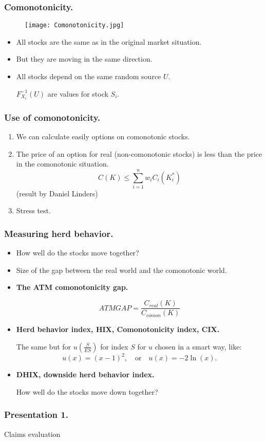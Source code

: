 \documentclass{beamer}
\begin{document}
\begin{frame}
\frametitle{Comonotonicity.}
\begin{figure}[h!]
\centering
\texttt{[image: Comonotonicity.jpg]}
\end{figure}
\begin{itemize}
	\item All stocks are the same as in the original market situation.
	\item But they are moving in the same direction.
	\item All stocks depend on the same random source $U$.
	
	$F^{-1}_{X_i}(U)$ are values for stock $S_i$.
\end{itemize}
\end{frame}
\begin{frame}
\frametitle{Use of comonotonicity.}
\begin{enumerate}
  \item We can calculate easily options on comonotonic stocks.
	\item The price of an option for real (non-comonotonic stocks) is less than the price in the comonotonic situation.
	$$C(K)\leq\sum_{i=1}^n w_i C_i(K_i^*)$$
	(result by Daniel Linders)
	\item Stress test.
\end{enumerate}
\end{frame}
\begin{frame}
\frametitle{Measuring herd behavior.}
\begin{itemize}
	\item How well do the stocks move together?
	\item Size of the gap between the real world and the comonotonic world.
	\item \textbf{The ATM comonotonicity gap.}
	
	$$ATM GAP = \frac{C_{real}(K)}{C_{comon}(K)}$$
	\item \textbf{Herd behavior index, HIX, Comonotonicity index, CIX.} 
	
	The same but for $u\left(\frac{S}{ES}\right)$ for index $S$ for $u$ chosen in a smart  way, like:
	$$u(x) = (x-1)^2,\quad\textrm{or}\quad u(x) = -2\ln(x).$$
	\item \textbf{DHIX, downside herd behavior index.}
	
	How well do the stocks move down together?
\end{itemize}
\end{frame}
\begin{frame}[fragile]
\frametitle{Presentation 1.}
\begin{center}
\Large{Claims evaluation}
\end{center}
\end{frame}
\end{document}
